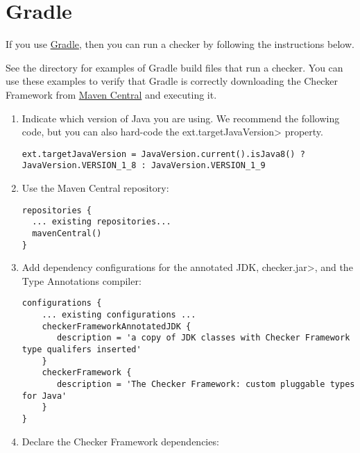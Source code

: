 \section{Gradle\label{gradle}}

If you use \href{https://gradle.org/}{Gradle},
then you can run a checker by following the instructions below.

See the directory  for examples of Gradle
build files that run a checker.  You can use these examples to verify that
Gradle is correctly downloading the Checker Framework from
\href{http://search.maven.org/#search\%7Cga\%7C1\%7Corg.checkerframework}{Maven
  Central} and executing it.

\begin{enumerate}

\item Indicate which version of Java you are using.  We recommend the
  following code, but you can also hard-code the \<ext.targetJavaVersion>
  property.

\begin{mysmall}
\begin{Verbatim}
ext.targetJavaVersion = JavaVersion.current().isJava8() ? JavaVersion.VERSION_1_8 : JavaVersion.VERSION_1_9
\end{Verbatim}
\end{mysmall}

\item Use the Maven Central repository:

\begin{Verbatim}
repositories {
  ... existing repositories...
  mavenCentral()
}
\end{Verbatim}

\item Add dependency configurations for the annotated JDK, \<checker.jar>, and the Type Annotations compiler:

\begin{mysmall}
\begin{Verbatim}
configurations {
    ... existing configurations ...
    checkerFrameworkAnnotatedJDK {
       description = 'a copy of JDK classes with Checker Framework type qualifers inserted'
    }
    checkerFramework {
       description = 'The Checker Framework: custom pluggable types for Java'
    }
}
\end{Verbatim}
\end{mysmall}

\item Declare the Checker Framework dependencies:


\end{enumerate}
